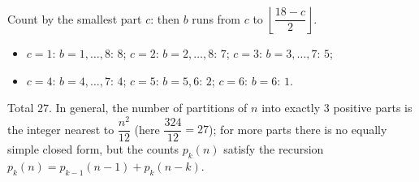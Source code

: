 Count by the smallest part $c$: then $b$ runs from $c$ to $\left\lfloor\dfrac{18-c}{2}\right\rfloor$.
\begin{itemize}
\item $c=1$: $b=1,\dots,8$: $8$; \quad $c=2$: $b=2,\dots,8$: $7$; \quad $c=3$: $b=3,\dots,7$: $5$;
\item $c=4$: $b=4,\dots,7$: $4$; \quad $c=5$: $b=5,6$: $2$; \quad $c=6$: $b=6$: $1$.
\end{itemize}
Total $\boxed{27}$. In general, the number of partitions of $n$ into exactly $3$ positive parts is the integer nearest to $\dfrac{n^2}{12}$ (here $\dfrac{324}{12}=27$); for more parts there is no equally simple closed form, but the counts $p_k(n)$ satisfy the recursion $p_k(n)=p_{k-1}(n-1)+p_k(n-k)$.
